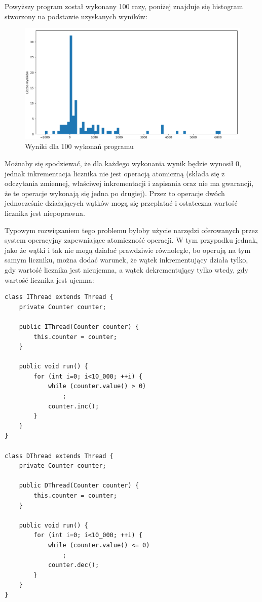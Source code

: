 \documentclass{article}
\begin{document}
\newpage

Powyższy program został wykonany 100 razy, poniżej znajduje się histogram stworzony na 
podstawie uzyskanych wyników:

\begin{figure}[H]
    \centering
    \includegraphics[width=\textwidth]{figure.png}
    \caption{Wyniki dla 100 wykonań programu}
\end{figure}

Możnaby się spodziewać, że dla każdego wykonania wynik będzie wynosił 0, jednak 
inkrementacja licznika nie jest operacją atomiczną (składa się z odczytania zmiennej, 
właściwej inkrementacji i zapisania oraz nie ma gwarancji, że te operacje wykonają się jedna po drugiej).
Przez to operacje dwóch jednocześnie działających wątków mogą się przeplatać i ostateczna wartość 
licznika jest niepoprawna.

Typowym rozwiązaniem tego problemu byłoby użycie narzędzi oferowanych przez system operacyjny zapewniające
atomiczność operacji. W tym przypadku jednak, jako że wątki i tak nie mogą działać prawdziwie równolegle,
bo operują na tym samym liczniku, można dodać warunek, że wątek inkrementujący działa tylko, gdy wartość licznika
jest nieujemna, a wątek dekrementujący tylko wtedy, gdy wartość licznika jest ujemna:

\begin{verbatim}
class IThread extends Thread {
    private Counter counter;

    public IThread(Counter counter) {
        this.counter = counter;
    }

    public void run() {
        for (int i=0; i<10_000; ++i) {
            while (counter.value() > 0)
                ;
            counter.inc();
        }
    }
}

class DThread extends Thread {
    private Counter counter;

    public DThread(Counter counter) {
        this.counter = counter;
    }

    public void run() {
        for (int i=0; i<10_000; ++i) {
            while (counter.value() <= 0)
                ;
            counter.dec();
        }
    }
}
\end{verbatim}
\end{document}
